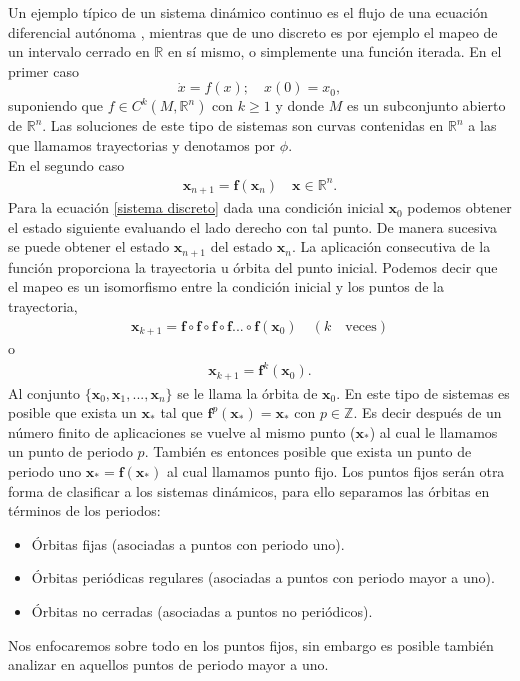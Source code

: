 Un ejemplo típico de un sistema dinámico continuo es el flujo de una ecuación diferencial autónoma , mientras que de uno discreto es por ejemplo el mapeo de un intervalo cerrado en $\mathbb{R}$ en sí mismo, o simplemente una función iterada. En el primer caso
\begin{equation}
\dot{x} =  f(x); \quad  
x(0)=x_{0} , \label{ec dif}
\end{equation}
suponiendo que $f \in C^{k}(M,\mathbb{R}^{n})$ con $k \geq 1$ y donde $M$ es un subconjunto abierto de $\mathbb{R}^{n}$. Las soluciones de este tipo de sistemas son curvas contenidas en $\mathbb{R}^{n}$ a las que llamamos trayectorias y denotamos por $\phi$.\\
En el segundo caso  
\begin{eqnarray}
\pmb x_{n+1}= \mathbf{f}(\pmb x_{n}) \quad \pmb x\in \mathbb{R}^{n}. \label{sistema discreto}
\end{eqnarray}
Para la ecuación \ref{sistema discreto} dada una condición inicial $\pmb x_{0}$ podemos obtener el estado siguiente evaluando el lado derecho con tal punto. De manera sucesiva se puede obtener el estado $\pmb x_{n+1}$ del estado $\pmb x_{n}$. La aplicación consecutiva de la función proporciona la trayectoria u órbita del punto inicial. Podemos decir que el mapeo es un isomorfismo entre la condición inicial y los puntos de la trayectoria,
\begin{eqnarray*}
\pmb x_{k+1}=\mathbf{f}\circ\mathbf{f}\circ \mathbf{f} \circ \mathbf{f} ... \circ \mathbf{f} (\pmb x_{0})\quad (k \quad \textrm{veces})
\end{eqnarray*}
o
\begin{eqnarray*}
\pmb x_{k+1} = \mathbf{f}^{k}(\pmb x_{0}).
\end{eqnarray*}
Al conjunto $\lbrace \pmb x_{0},\pmb x_{1},...,\pmb x_{n} \rbrace$ se le llama la órbita de $\pmb x_{0}$.  En este tipo de sistemas es posible que exista un $\pmb x_{*}$ tal que $\mathbf{f}^{p}(\pmb x_{*})=\pmb x_{*}$ con $p \in \mathbb{Z}$. Es decir después de un número finito de aplicaciones se vuelve al mismo punto ($\pmb x_{*}$) al cual le llamamos un punto de periodo $p$. También es entonces posible  que exista un punto de periodo uno $\pmb x_{*}=\mathbf{f}(\pmb x_{*})$ al cual llamamos punto fijo. Los puntos fijos serán otra forma de clasificar a los sistemas dinámicos, para ello separamos las órbitas en términos de los periodos:

\begin{itemize}
\item  Órbitas fijas (asociadas a puntos con periodo uno).
\item Órbitas periódicas regulares (asociadas a puntos con periodo mayor a uno).
\item Órbitas no cerradas (asociadas a puntos no periódicos).
\end{itemize}
Nos enfocaremos sobre todo en los puntos fijos, sin embargo es posible también analizar en aquellos puntos de periodo mayor a uno.
